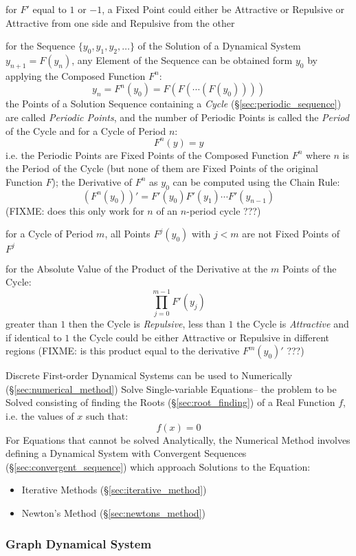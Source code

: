 for $F'$ equal to $1$ or $-1$, a Fixed Point could either be Attractive or
Repulsive or Attractive from one side and Repulsive from the other

for the Sequence $\{ y_0, y_1, y_2, \ldots \}$ of the Solution of a Dynamical
System $y_{n+1} = F(y_n)$, any Element of the Sequence can be obtained form
$y_0$ by applying the Composed Function $F^n$:
\[
  y_n = F^n(y_0) = F(F(\cdots(F(y_0))))
\]
the Points of a Solution Sequence containing a \emph{Cycle}
(\S\ref{sec:periodic_sequence}) are called \emph{Periodic Points}, and the
number of Periodic Points is called the \emph{Period} of the Cycle and for
a Cycle of Period $n$:
\[
  F^n(y) = y
\]
i.e. the Periodic Points are Fixed Points of the Composed Function $F^n$ where
$n$ is the Period of the Cycle (but none of them are Fixed Points of the
original Function $F$);
the Derivative of $F^n$ as $y_0$ can be computed using the Chain Rule:
\[
  (F^n(y_0))' = F'(y_0)F'(y_1)\cdots{F'(y_{n-1})}
\]
(FIXME: does this only work for $n$ of an $n$-period cycle ???)

for a Cycle of Period $m$, all Points $F^j(y_0)$ with $j < m$ are not Fixed
Points of $F^j$

for the Absolute Value of the Product of the Derivative at the $m$ Points of the
Cycle:
\[
  \prod_{j=0}^{m-1} F'(y_j)
\]
greater than $1$ then the Cycle is \emph{Repulsive}, less than $1$ the Cycle is
\emph{Attractive} and if identical to $1$ the Cycle could be either Attractive
or Repulsive in different regions
(FIXME: is this product equal to the derivative $F^m(y_0)'$ ???)

Discrete First-order Dynamical Systems can be used to Numerically
(\S\ref{sec:numerical_method}) Solve Single-variable Equations-- the problem to
be Solved consisting of finding the Roots (\S\ref{sec:root_finding}) of a Real
Function $f$, i.e. the values of $x$ such that:
\[
  f(x) = 0
\]
For Equations that cannot be solved Analytically, the Numerical Method involves
defining a Dynamical System with Convergent Sequences
(\S\ref{sec:convergent_sequence}) which approach Solutions to the Equation:
\begin{itemize}
  \item Iterative Methods (\S\ref{sec:iterative_method})
  \item Newton's Method (\S\ref{sec:newtons_method})
\end{itemize}



\subsubsection{Graph Dynamical System}\label{sec:graph_dynamical_system}


